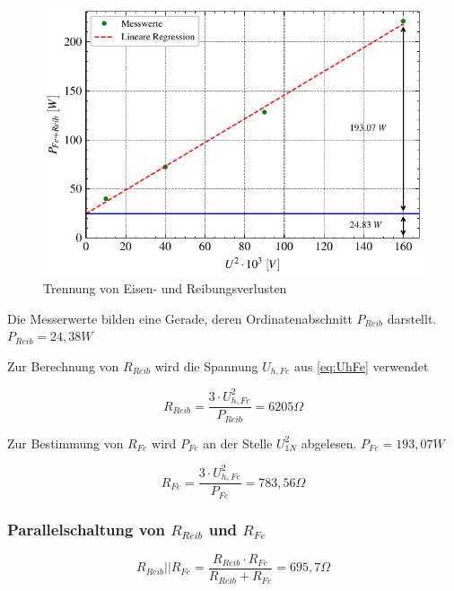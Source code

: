 \documentclass[conference]{IEEEtran}
\begin{document}
\begin{figure}[htbp]
    \centering
    \includegraphics[width=\columnwidth]{./figures/trennung_eisen_reib.pdf}
    \caption{Trennung von Eisen- und Reibungsverlusten}
    \label{fig:trennung_von_eisen_reib}
\end{figure}

Die Messerwerte bilden eine Gerade, deren Ordinatenabschnitt $P_{Reib}$
darstellt. $P_{Reib} = 24,38 \si{W}$

Zur Berechnung von $R_{Reib}$ wird die Spannung $U_{h, Fe}$ aus {\ref{eq:UhFe}}
verwendet

\begin{equation}
    R_{Reib} = \dfrac{3\cdot U_{h, Fe}^{2}}{ P_{Reib} } = 6205 \Omega
\end{equation}

Zur Bestimmung von $R_{Fe}$ wird $P_{Fe}$ an der Stelle $U_{1N}^{2}$ abgelesen.
$P_{Fe} = 193,07 \si{W}$

\begin{equation}
    R_{Fe} = \dfrac{3\cdot U_{h,Fe}^{2}}{ P_{Fe} } = 783,56 \Omega
\end{equation}


\subsubsection{Parallelschaltung von $R_{Reib}$ und $R_{Fe}$ }

\begin{equation}
    R_{Reib}||R_{Fe} = \dfrac{ R_{Reib} \cdot R_{Fe}}{R_{Reib} + R_{Fe}} = 695,7 \Omega
\end{equation}
\end{document}
